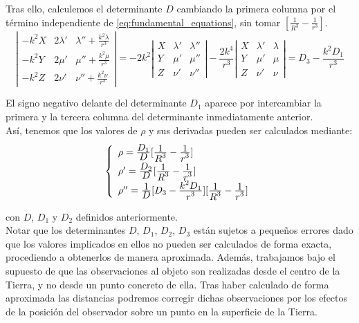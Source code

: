 Tras ello, calculemos el determinante $D$ cambiando la primera columna por el término independiente de \eqref{eq:fundamental_equations}, sin tomar $[\frac{1}{R^3}-\frac{1}{r^3}]$. 
\[
\left|
\begin{array}{ccc}
-k^2X & 2\lambda' & \lambda''+\frac{k^2\lambda}{r^3}\\
-k^2Y & 2\mu' & \mu''+\frac{k^2\mu}{r^3}\\
-k^2Z & 2\nu' & \nu''+\frac{k^2\nu}{r^3}
\end{array}
\right|
=-2k^2
\left|
\begin{array}{ccc}
X & \lambda' & \lambda''\\
Y & \mu' & \mu''\\
Z & \nu' & \nu''
\end{array}
\right|
-\frac{2k^4}{r^3}
\left|
\begin{array}{ccc}
X & \lambda' & \lambda\\
Y & \mu' & \mu\\
Z & \nu' & \nu
\end{array}
\right|
=
D_3-\frac{k^2D_1}{r^3}
\]

El signo negativo delante del determinante $D_1$ aparece por intercambiar la primera y la tercera columna del determinante inmediatamente anterior.\\

Así, tenemos que los valores de $\rho$ y sus derivadas pueden ser calculados mediante:
\begin{align}
\left\{
\def\arraystretch{1.5}
\begin{array}{l}
	\rho   = \ddfrac{D_1}{D}[\ddfrac{1}{R^3}-\ddfrac{1}{r^3}]\\
	\rho'  = \ddfrac{D_2}{D}[\ddfrac{1}{R^3}-\ddfrac{1}{r^3}]\\
	\rho'' = \ddfrac{1}{D}[D_3-\ddfrac{k^2D_1}{r^3}][\ddfrac{1}{R^3}-\ddfrac{1}{r^3}]
\end{array}
\right.
\label{eq:rho_values}
\end{align}

\noindent con $D$, $D_1$ y $D_2$ definidos anteriormente.\\

Notar que los determinantes $D$, $D_1$, $D_2$, $D_3$ están sujetos a pequeños errores dado que los valores implicados en ellos no pueden ser calculados de forma exacta, procediendo a obtenerlos de manera aproximada. Además, trabajamos bajo el supuesto de que las observaciones al objeto son realizadas desde el centro de la Tierra, y no desde un punto concreto de ella. Tras haber calculado de forma aproximada las distancias podremos corregir dichas observaciones por los efectos de la posición del observador sobre un punto en la superficie de la Tierra.\\


